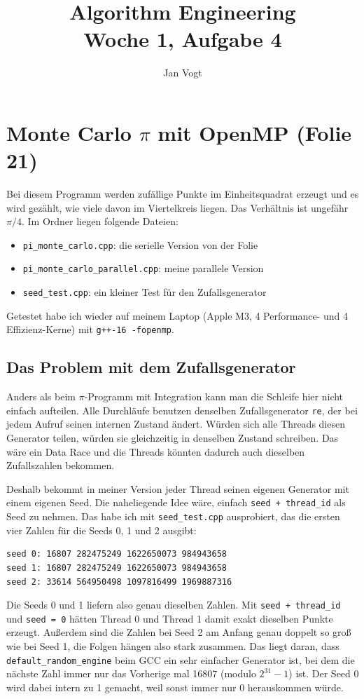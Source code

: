 \documentclass[11pt]{article}
\title{Algorithm Engineering\\Woche 1, Aufgabe 4}
\author{Jan Vogt}
\date{}
\begin{document}
\maketitle

\section*{Monte Carlo $\pi$ mit OpenMP (Folie 21)}

Bei diesem Programm werden zufällige Punkte im Einheitsquadrat erzeugt und es wird gezählt, wie
viele davon im Viertelkreis liegen. Das Verhältnis ist ungefähr $\pi/4$. Im Ordner liegen
folgende Dateien:
\begin{itemize}
  \item \texttt{pi\_monte\_carlo.cpp}: die serielle Version von der Folie
  \item \texttt{pi\_monte\_carlo\_parallel.cpp}: meine parallele Version
  \item \texttt{seed\_test.cpp}: ein kleiner Test für den Zufallsgenerator
\end{itemize}
Getestet habe ich wieder auf meinem Laptop (Apple M3, 4 Performance- und 4 Effizienz-Kerne) mit
\texttt{g++-16 -fopenmp}.

\subsection*{Das Problem mit dem Zufallsgenerator}

Anders als beim $\pi$-Programm mit Integration kann man die Schleife hier nicht einfach aufteilen.
Alle Durchläufe benutzen denselben Zufallsgenerator \texttt{re}, der bei jedem Aufruf seinen
internen Zustand ändert. Würden sich alle Threads diesen Generator teilen, würden sie gleichzeitig
in denselben Zustand schreiben. Das wäre ein Data Race und die Threads könnten dadurch auch
dieselben Zufallszahlen bekommen.

Deshalb bekommt in meiner Version jeder Thread seinen eigenen Generator mit einem eigenen Seed. Die
naheliegende Idee wäre, einfach \texttt{seed + thread\_id} als Seed zu nehmen. Das habe ich mit
\texttt{seed\_test.cpp} ausprobiert, das die ersten vier Zahlen für die Seeds 0, 1 und 2 ausgibt:
\begin{verbatim}
seed 0: 16807 282475249 1622650073 984943658
seed 1: 16807 282475249 1622650073 984943658
seed 2: 33614 564950498 1097816499 1969887316
\end{verbatim}
Die Seeds 0 und 1 liefern also genau dieselben Zahlen. Mit \texttt{seed + thread\_id} und
\texttt{seed = 0} hätten Thread 0 und Thread 1 damit exakt dieselben Punkte erzeugt. Außerdem sind
die Zahlen bei Seed 2 am Anfang genau doppelt so groß wie bei Seed 1, die Folgen hängen also stark
zusammen. Das liegt daran, dass \texttt{default\_random\_engine} beim GCC ein sehr einfacher
Generator ist, bei dem die nächste Zahl immer nur das Vorherige mal 16807 (modulo $2^{31}-1$) ist.
Der Seed 0 wird dabei intern zu 1 gemacht, weil sonst immer nur 0 herauskommen würde.
\end{document}
